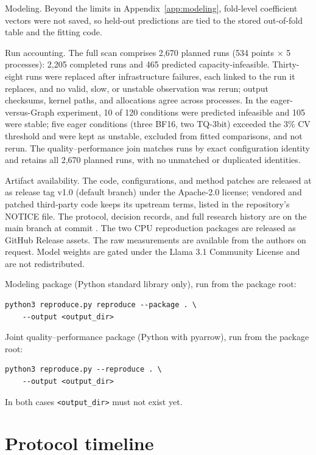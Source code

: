 Modeling.
Beyond the limits in Appendix~\ref{app:modeling}, fold-level coefficient vectors were not saved, so held-out predictions are tied to the stored out-of-fold table and the fitting code.

Run accounting.
The full scan comprises 2,670 planned runs (534 points $\times$ 5 processes): 2,205 completed runs and 465 predicted capacity-infeasible.
Thirty-eight runs were replaced after infrastructure failures, each linked to the run it replaces, and no valid, slow, or unstable observation was rerun; output checksums, kernel paths, and allocations agree across processes.
In the eager-versus-Graph experiment, 10 of 120 conditions were predicted infeasible and 105 were stable; five eager conditions (three BF16, two TQ-3bit) exceeded the 3\% CV threshold and were kept as unstable, excluded from fitted comparisons, and not rerun.
The quality--performance join matches runs by exact configuration identity and retains all 2,670 planned runs, with no unmatched or duplicated identities.

Artifact availability.
The code, configurations, and method patches are released at \anonurl{\RepoURL} as release tag v1.0 (default branch) under the Apache-2.0 license; vendored and patched third-party code keeps its upstream terms, listed in the repository's NOTICE file.
The protocol, decision records, and full research history are on the main branch at commit .
The two CPU reproduction packages are released as GitHub Release assets.
The raw measurements are available from the authors on request.
Model weights are gated under the Llama 3.1 Community License and are not redistributed.

Modeling package (Python standard library only), run from the package root:

{\scriptsize
\begin{verbatim}
python3 reproduce.py reproduce --package . \
    --output <output_dir>
\end{verbatim}
}

Joint quality--performance package (Python with pyarrow), run from the package root:

{\scriptsize
\begin{verbatim}
python3 reproduce.py --reproduce . \
    --output <output_dir>
\end{verbatim}
}

In both cases \texttt{<output\_dir>} must not exist yet.
\section{Protocol timeline}
\label{app:timeline}

